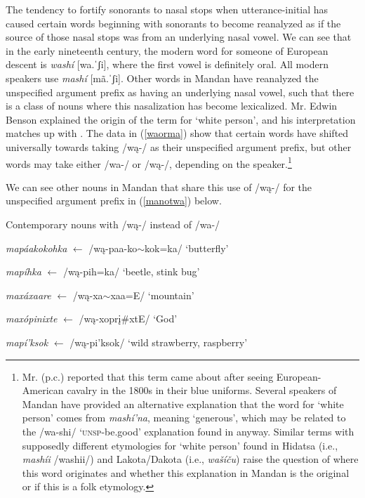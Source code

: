 The tendency to fortify sonorants to nasal stops when utterance-initial has caused certain words beginning with sonorants to become reanalyzed as if the source of those nasal stops was from an underlying nasal vowel. We can see that in the early nineteenth century, the modern word for someone of European descent is \textit{washí} [wa.ˈʃi], where the first vowel is definitely oral. All modern speakers use \textit{mashí} [mã.ˈʃi]. Other words in Mandan have reanalyzed the unspecified argument prefix as having an underlying nasal vowel, such that there is a class of nouns where this nasalization has become lexicalized. Mr. Edwin Benson explained the origin of the term for `white person', and his interpretation matches up with . The data in (\ref{waorma}) show that certain words have shifted universally towards taking /wą-/ as their unspecified argument prefix, but other words may take either /wa-/ or /wą-/, depending on the speaker.\footnote{Mr. \citeauthor{benson2000} (p.c.) reported that this term came about after seeing European-American cavalry in the 1800s in their blue uniforms. Several speakers of Mandan have provided an alternative explanation that the word for `white person' comes from \textit{mashí'na}, meaning `generous', which may be related to the /wa-shi/ `\textsc{unsp}-be.good' explanation found in \citet{maximilian1839} anyway. Similar terms with supposedly different etymologies for `white person' found in Hidatsa (i.e., \textit{mashíi} /washii/) and Lakota/Dakota (i.e., \textit{wašíču}) raise the question of where this word originates and whether this explanation in Mandan is the original or if this is a folk etymology.}

We can see other nouns in Mandan that share this use of /wą-/ for the unspecified argument prefix in (\ref{manotwa}) below.

\begin{exe}

\item\label{manotwa} Contemporary nouns with /wą-/ instead of /wa-/

	\begin{xlist}
	
	\item \textit{mapáakokohka} $\leftarrow$ /wą-paa-ko$\sim$kok=ka/ `butterfly' \citep[270]{hollow1970}
	
	\item \textit{mapíhka} $\leftarrow$ /wą-pih=ka/ `beetle, stink bug' \citep[490]{hollow1970}
	
	\item \textit{maxáxaare} $\leftarrow$ /wą-xa$\sim$xaa=E/ `mountain' \citep[490]{hollow1970}
	
	\item \textit{maxópinixte} $\leftarrow$ /wą-xoprį\#xtE/ `God' \citep[490]{hollow1970}
	
	\item \textit{mapí'ksok} $\leftarrow$ /wą-pi'ksok/ `wild strawberry, raspberry' \citep[272]{hollow1970}
	
	\end{xlist}

\end{exe}

